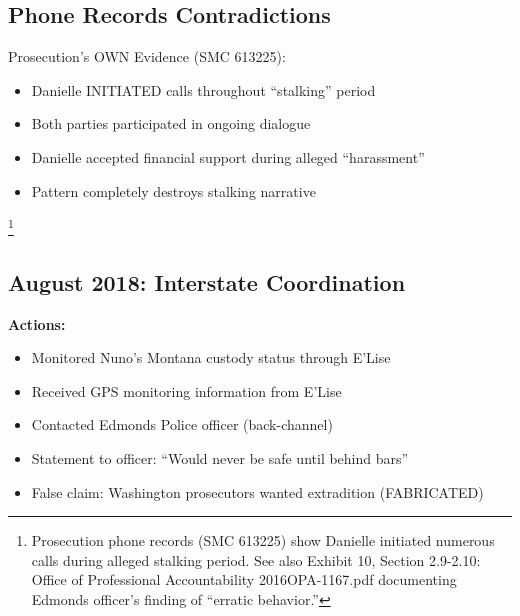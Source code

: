 \documentclass[12pt,oneside]{article}
\begin{document}
\subsection*{Phone Records Contradictions}

Prosecution's OWN Evidence (SMC 613225):

\begin{itemize}

\item Danielle INITIATED calls throughout ``stalking'' period

\item Both parties participated in ongoing dialogue

\item Danielle accepted financial support during alleged ``harassment''

\item Pattern completely destroys stalking narrative

\end{itemize}

\footnote{Prosecution phone records (SMC 613225) show Danielle initiated numerous calls during alleged stalking period. See also Exhibit 10, Section 2.9-2.10: Office of Professional Accountability 2016OPA-1167.pdf documenting Edmonds officer's finding of ``erratic behavior.''}

\subsection*{August 2018: Interstate Coordination}

\textbf{Actions:}

\begin{itemize}

\item Monitored Nuno's Montana custody status through E'Lise

\item Received GPS monitoring information from E'Lise

\item Contacted Edmonds Police officer (back-channel)

\item Statement to officer: ``Would never be safe until behind bars''

\item False claim: Washington prosecutors wanted extradition (FABRICATED)

\end{itemize}
\end{document}
